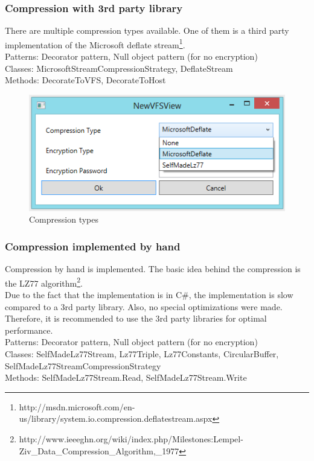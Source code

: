 \documentclass[JCDReport.tex]{subfiles}
\begin{document}
\subsubsection{Compression with 3rd party library}
There are multiple compression types available. One of them is a third party implementation of the Microsoft deflate stream\footnote{http://msdn.microsoft.com/en-us/library/system.io.compression.deflatestream.aspx}.\\
Patterns: Decorator pattern, Null object pattern (for no encryption)\\
Classes: MicrosoftStreamCompressionStrategy, DeflateStream\\
Methods: DecorateToVFS, DecorateToHost\\
\begin{figure}[h!]
	\centering
	\includegraphics[scale=1]{Images/compression_types.png} 
	\caption{Compression types}
\end{figure}

\subsubsection{Compression implemented by hand}
Compression by hand is implemented. The basic idea behind the compression is the LZ77 algorithm\footnote{http://www.ieeeghn.org/wiki/index.php/Milestones:Lempel-Ziv\_Data\_Compression\_Algorithm,\_1977}.\\
Due to the fact that the implementation is in C#, the implementation is slow compared to a 3rd party library. Also, no special optimizations were made. Therefore, it is recommended to use the 3rd party libraries for optimal performance.\\
Patterns: Decorator pattern, Null object pattern (for no encryption)\\
Classes: SelfMadeLz77Stream, Lz77Triple, Lz77Constants, CircularBuffer, SelfMadeLz77StreamCompressionStrategy\\
Methods: SelfMadeLz77Stream.Read, SelfMadeLz77Stream.Write
\end{document}
